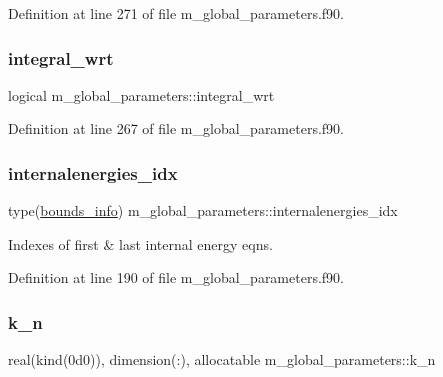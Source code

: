 Definition at line 271 of file m\+\_\+global\+\_\+parameters.\+f90.

\mbox{\label{namespacem__global__parameters_a530bdd6416ce213046d14488fb48dbc2}} 
\subsubsection{\texorpdfstring{integral\+\_\+wrt}{integral\_wrt}}
{\footnotesize\ttfamily logical m\+\_\+global\+\_\+parameters\+::integral\+\_\+wrt}



Definition at line 267 of file m\+\_\+global\+\_\+parameters.\+f90.

\mbox{\label{namespacem__global__parameters_aac5ed9f316eeebbe04258bb1120cbea4}} 
\subsubsection{\texorpdfstring{internalenergies\+\_\+idx}{internalenergies\_idx}}
{\footnotesize\ttfamily type(\hyperlink{structm__derived__types_1_1bounds__info}{bounds\+\_\+info}) m\+\_\+global\+\_\+parameters\+::internalenergies\+\_\+idx}



Indexes of first \& last internal energy eqns. 



Definition at line 190 of file m\+\_\+global\+\_\+parameters.\+f90.

\mbox{\label{namespacem__global__parameters_a555eda1318a218d37d1bdd8f4d57eaf2}} 
\subsubsection{\texorpdfstring{k\+\_\+n}{k\_n}}
{\footnotesize\ttfamily real(kind(0d0)), dimension(\+:), allocatable m\+\_\+global\+\_\+parameters\+::k\+\_\+n}



